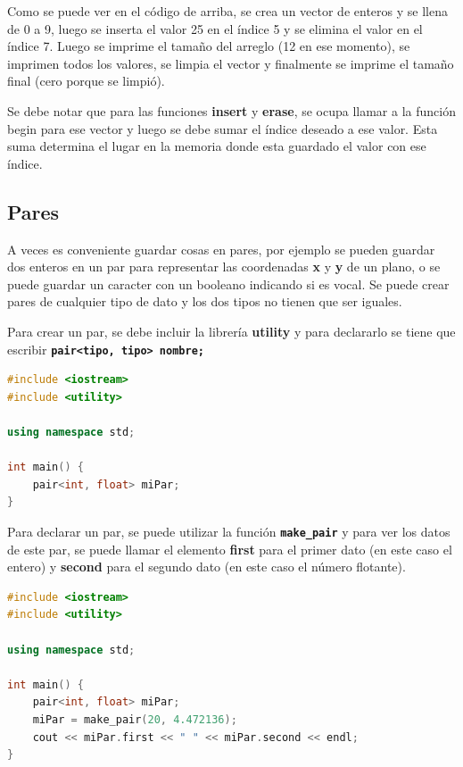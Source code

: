 \documentclass{article}
\begin{document}
Como se puede ver en el código de arriba, se crea un vector de enteros y se llena de 0 a 9, luego se inserta el valor 25 en el índice 5 y se elimina el valor en el índice 7. Luego se imprime el tamaño del arreglo (12 en ese momento), se imprimen todos los valores, se limpia el vector y finalmente se imprime el tamaño final (cero porque se limpió).

Se debe notar que para las funciones \textbf{insert} y \textbf{erase}, se ocupa llamar a la función begin para ese vector y luego se debe sumar el índice deseado a ese valor. Esta suma determina el lugar en la memoria donde esta guardado el valor con ese índice.

\subsection{Pares}

A veces es conveniente guardar cosas en pares, por ejemplo se pueden guardar dos enteros en un par para representar las coordenadas \textbf{x} y \textbf{y} de un plano, o se puede guardar un caracter con un booleano indicando si es vocal. Se puede crear pares de cualquier tipo de dato y los dos tipos no tienen que ser iguales.

Para crear un par, se debe incluir la librería \textbf{utility} y para declararlo se tiene que escribir \textbf{\lstinline{pair<tipo, tipo> nombre;}}

\begin{lstlisting}[language=C++, caption=Declarando pares]
#include <iostream>
#include <utility>

using namespace std;

int main() {
    pair<int, float> miPar;
}
\end{lstlisting}

Para declarar un par, se puede utilizar la función \textbf{\lstinline{make_pair}} y para ver los datos de este par, se puede llamar el elemento \textbf{first} para el primer dato (en este caso el entero) y \textbf{second} para el segundo dato (en este caso el número flotante).

\begin{lstlisting}[language=C++, caption=Declarando pares]
#include <iostream>
#include <utility>

using namespace std;

int main() {
    pair<int, float> miPar;
    miPar = make_pair(20, 4.472136);
    cout << miPar.first << " " << miPar.second << endl;
}
\end{lstlisting}
\end{document}
